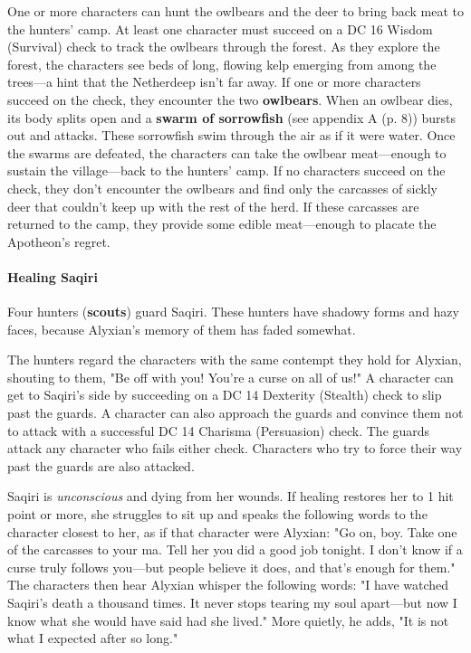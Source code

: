 \documentclass[letterpaper, 11pt, bg=full, twocolumn]{dndbook}
\begin{document}
One or more characters can hunt the owlbears and the deer to bring back meat to the hunters' camp. At least one character must succeed on a DC 16 Wisdom (Survival) check to track the owlbears through the forest. As they explore the forest, the characters see beds of long, flowing kelp emerging from among the trees---a hint that the Netherdeep isn't far away. If one or more characters succeed on the check, they encounter the two \textbf{owlbears}. When an owlbear dies, its body splits open and a \textbf{swarm of sorrowfish} (see appendix A (p. 8)) bursts out and attacks. These sorrowfish swim through the air as if it were water. Once the swarms are defeated, the characters can take the owlbear meat---enough to sustain the village---back to the hunters' camp. If no characters succeed on the check, they don't encounter the owlbears and find only the carcasses of sickly deer that couldn't keep up with the rest of the herd. If these carcasses are returned to the camp, they provide some edible meat---enough to placate the Apotheon's regret.

\paragraph{Healing Saqiri}

Four hunters (\textbf{scouts}) guard Saqiri. These hunters have shadowy forms and hazy faces, because Alyxian's memory of them has faded somewhat.

The hunters regard the characters with the same contempt they hold for Alyxian, shouting to them, "Be off with you! You're a curse on all of us!" A character can get to Saqiri's side by succeeding on a DC 14 Dexterity (Stealth) check to slip past the guards. A character can also approach the guards and convince them not to attack with a successful DC 14 Charisma (Persuasion) check. The guards attack any character who fails either check. Characters who try to force their way past the guards are also attacked.

Saqiri is \textit{unconscious} and dying from her wounds. If healing restores her to 1 hit point or more, she struggles to sit up and speaks the following words to the character closest to her, as if that character were Alyxian: "Go on, boy. Take one of the carcasses to your ma. Tell her you did a good job tonight. I don't know if a curse truly follows you---but people believe it does, and that's enough for them." The characters then hear Alyxian whisper the following words: "I have watched Saqiri's death a thousand times. It never stops tearing my soul apart---but now I know what she would have said had she lived." More quietly, he adds, "It is not what I expected after so long."
\end{document}
